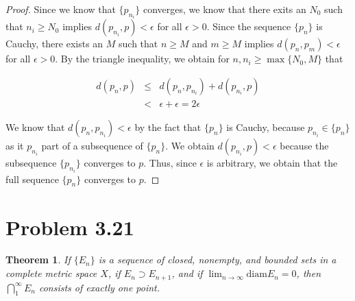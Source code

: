 \documentclass[psamsfonts]{amsart}
\newtheorem{thm}{Theorem}[section]
\theoremstyle{definition}
\theoremstyle{remark}
\numberwithin{equation}{section}
\begin{document}
\begin{proof}
Since we know that $\{ p_{n_i} \}$ converges, we know that there exits an $N_0$ such that $n_i \geq N_0$ implies $d(p_{n_i}, p) < \epsilon$ for all $\epsilon > 0$. Since the sequence $\{ p_n \}$ is Cauchy, there exists an $M$ such that $n \geq M$ and $m \geq M$ implies $d(p_n, p_m) < \epsilon$ for all $\epsilon > 0$. By the triangle inequality, we obtain for $n, n_i \geq \max \{ N_0, M \} $ that

\begin{eqnarray}
d(p_n,p) &\leq& d(p_n, p_{n_i}) + d(p_{n_i},p) \\
&<& \epsilon + \epsilon = 2 \epsilon \nonumber
\end{eqnarray}

We know that $d(p_n, p_{n_i} ) < \epsilon$ by the fact that $\{ p_n \}$ is Cauchy, because $p_{n_i} \in \{ p_n \}$ as it $p_{n_i}$ part of a subsequence of $\{ p_n \}$. We obtain $d(p_{n_i},p) < \epsilon$ because the subsequence $\{ p_{n_i} \}$ converges to $p$. Thus, since $\epsilon$ is arbitrary, we obtain that the full sequence $\{ p_n \}$ converges to $p$.
\end{proof}

\section{Problem 3.21}
\begin{thm}
If $\{ E_n \}$ is a sequence of closed, nonempty, and bounded sets in a complete metric space $X$, if $E_n \supset E_{n+1}$, and if $\lim_{n \to \infty} \text{diam} E_n = 0$, then $\bigcap_1^\infty E_n$ consists of exactly one point. 
\end{thm}
\end{document}
